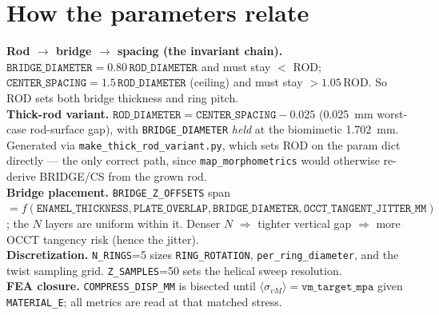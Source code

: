 \documentclass[11pt]{article}
\newcommand{\param}[1]{\texttt{#1}}
\begin{document}
\section{How the parameters relate}
\begin{notebox}
\small
\textbf{Rod $\rightarrow$ bridge $\rightarrow$ spacing (the invariant chain).}
$\param{BRIDGE\_DIAMETER}=0.80\,\param{ROD\_DIAMETER}$ and must stay $<$ ROD;
$\param{CENTER\_SPACING}=1.5\,\param{ROD\_DIAMETER}$ (ceiling) and must stay $>1.05\,$ROD.
So ROD sets both bridge thickness and ring pitch.\\[4pt]
\textbf{Thick-rod variant.} $\param{ROD\_DIAMETER}=\param{CENTER\_SPACING}-0.025$ (\SI{0.025}{mm}
worst-case rod-surface gap), with \param{BRIDGE\_DIAMETER} \emph{held} at the biomimetic
\SI{1.702}{mm}. Generated via \texttt{make\_thick\_rod\_variant.py}, which sets ROD on the
param dict directly --- the only correct path, since \param{map\_morphometrics} would otherwise
re-derive BRIDGE/CS from the grown rod.\\[4pt]
\textbf{Bridge placement.} \param{BRIDGE\_Z\_OFFSETS} span $=f(\param{ENAMEL\_THICKNESS},
\param{PLATE\_OVERLAP}, \param{BRIDGE\_DIAMETER}, \param{OCCT\_TANGENT\_JITTER\_MM})$; the
$N$ layers are uniform within it. Denser $N$ $\Rightarrow$ tighter vertical gap $\Rightarrow$
more OCCT tangency risk (hence the jitter).\\[4pt]
\textbf{Discretization.} \param{N\_RINGS}=5 sizes \param{RING\_ROTATION}, \param{per\_ring\_diameter},
and the twist sampling grid. \param{Z\_SAMPLES}=50 sets the helical sweep resolution.\\[4pt]
\textbf{FEA closure.} \param{COMPRESS\_DISP\_MM} is bisected until $\langle\sigma_{vM}\rangle=
\param{vm\_target\_mpa}$ given \param{MATERIAL\_E}; all metrics are read at that matched stress.
\end{notebox}

\end{document}
